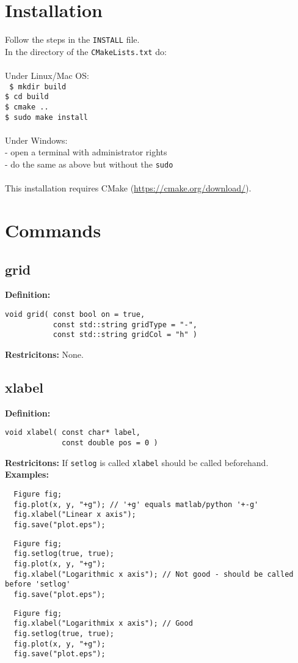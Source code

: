 \documentclass[a4paper]{article}
\newcommand{\command}[1]{\subsection{#1}}
\begin{document}
\section{Installation}

Follow the steps in the \texttt{INSTALL} file. \\
In the directory of the \texttt{CMakeLists.txt} do: \\ \\
Under Linux/Mac OS: \\
\texttt{
\indent   \$ mkdir build \\
\indent   \$ cd build \\
\indent   \$ cmake .. \\
\indent   \$ sudo make install \\ \\
}
Under Windows: \\
\indent    - open a terminal with administrator rights \\
\indent    - do the same as above but without the \texttt{sudo} \\ \\
%
This installation requires CMake (\url{https://cmake.org/download/}). 


\section{Commands}

\command{grid}

\textbf{Definition:}
\begin{lstlisting}
void grid( const bool on = true, 
           const std::string gridType = "-", 
           const std::string gridCol = "h" )
\end{lstlisting}
%
\textbf{Restricitons:} None.

\command{xlabel}

\textbf{Definition:}
\begin{lstlisting}
void xlabel( const char* label, 
             const double pos = 0 )
\end{lstlisting}
%
\textbf{Restricitons:} If \texttt{setlog} is called \texttt{xlabel} should be called beforehand. \\
%
\textbf{Examples:}
\begin{lstlisting}
  Figure fig;
  fig.plot(x, y, "+g"); // '+g' equals matlab/python '+-g'
  fig.xlabel("Linear x axis");
  fig.save("plot.eps");
\end{lstlisting}
\begin{lstlisting}
  Figure fig;
  fig.setlog(true, true);
  fig.plot(x, y, "+g");
  fig.xlabel("Logarithmic x axis"); // Not good - should be called before 'setlog'
  fig.save("plot.eps");
\end{lstlisting}
\begin{lstlisting}
  Figure fig;
  fig.xlabel("Logarithmix x axis"); // Good
  fig.setlog(true, true);
  fig.plot(x, y, "+g");
  fig.save("plot.eps");
\end{lstlisting}
\end{document}
